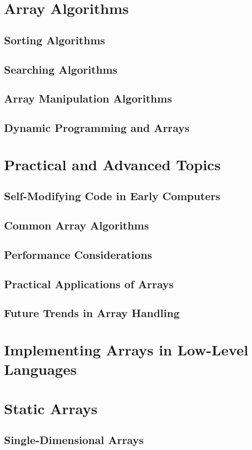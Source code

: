 \documentclass[12pt, oneside]{book}
\begin{document}
	\chapter{Array Algorithms}
	\section{Sorting Algorithms}
	\section{Searching Algorithms}
	\section{Array Manipulation Algorithms}
	\section{Dynamic Programming and Arrays}
	\chapter{Practical and Advanced Topics}
	\section{Self-Modifying Code in Early Computers}
	\section{Common Array Algorithms}
	\section{Performance Considerations}
	\section{Practical Applications of Arrays}
	\section{Future Trends in Array Handling}
	\chapter{Implementing Arrays in Low-Level Languages}
	\chapter{Static Arrays}
	\section{Single-Dimensional Arrays}
\end{document}
